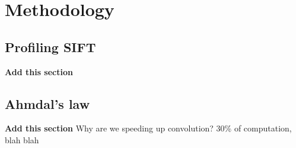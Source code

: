 \section{Methodology}
\subsection{Profiling SIFT}
{\bf Add this section}
\subsection{Ahmdal's law}
{\bf Add this section}
Why are we speeding up convolution? 30\% of computation, blah blah

